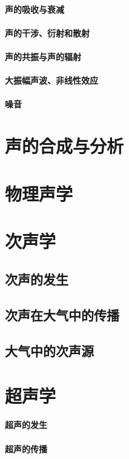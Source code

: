 \documentclass[UTF8]{../06-Physics}
\begin{document}
    \subsubsection{声的吸收与衰减}
    \subsubsection{声的干涉、衍射和散射}
    \subsubsection{声的共振与声的辐射}
    \subsubsection{大振幅声波、非线性效应}
    \subsubsection{噪音}


\chapter{声的合成与分析}
\chapter{物理声学}
\chapter{次声学}
    \section{次声的发生}
    \section{次声在大气中的传播}
    \section{大气中的次声源}



\chapter{超声学}
    \subsubsection{超声的发生}
    \subsubsection{超声的传播}
\end{document}
